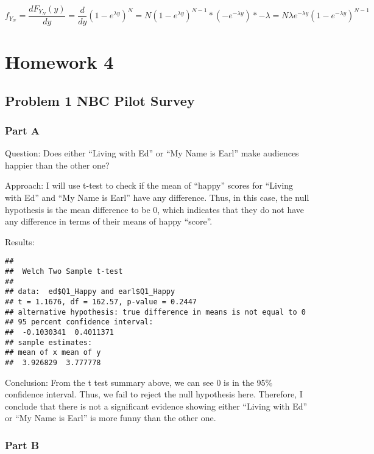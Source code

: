 \documentclass[
]{article}
\begin{document}
\[
f_{Y_N} = \frac {dF_{Y_N}(y)}{dy} = \frac {d}{dy}(1-e^{\lambda y})^N = N(1-e^{\lambda y})^{N-1}*(-e^{-\lambda y})*-\lambda = N\lambda e^{-\lambda y}(1-e^{-\lambda y})^{N-1}
\]

\hypertarget{homework-4}{%
\section{Homework 4}\label{homework-4}}

\hypertarget{problem-1-nbc-pilot-survey}{%
\subsection{Problem 1 NBC Pilot Survey}\label{problem-1-nbc-pilot-survey}}

\hypertarget{part-a-9}{%
\subsubsection{Part A}\label{part-a-9}}

Question: Does either ``Living with Ed'' or ``My Name is Earl'' make audiences happier than the other one?

Approach: I will use t-test to check if the mean of ``happy'' scores for ``Living with Ed'' and ``My Name is Earl'' have any difference. Thus, in this case, the null hypothesis is the mean difference to be 0, which indicates that they do not have any difference in terms of their means of happy ``score''.

Results:

\begin{verbatim}
## 
##  Welch Two Sample t-test
## 
## data:  ed$Q1_Happy and earl$Q1_Happy
## t = 1.1676, df = 162.57, p-value = 0.2447
## alternative hypothesis: true difference in means is not equal to 0
## 95 percent confidence interval:
##  -0.1030341  0.4011371
## sample estimates:
## mean of x mean of y 
##  3.926829  3.777778
\end{verbatim}

Conclusion: From the t test summary above, we can see 0 is in the 95\% confidence interval. Thus, we fail to reject the null hypothesis here. Therefore, I conclude that there is not a significant evidence showing either ``Living with Ed'' or ``My Name is Earl'' is more funny than the other one.

\hypertarget{part-b-9}{%
\subsubsection{Part B}\label{part-b-9}}
\end{document}
